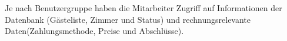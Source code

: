 \documentclass[../../Pflichtenheft.tex]{subfiles}
\begin{document}
    Je nach Benutzergruppe haben die Mitarbeiter Zugriff auf Informationen der Datenbank
    (Gästeliste, Zimmer und Status) und rechnungsrelevante Daten(Zahlungsmethode, Preise und Abschlüsse).
\end{document}
